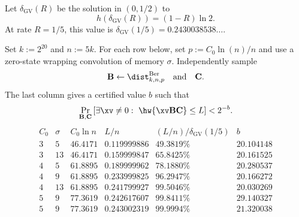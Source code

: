 Let $\delta_{\mathrm{GV}}(R)$ be the solution in $(0,1/2)$ to
\begin{equation}
 h(\delta_{\mathrm{GV}}(R))=(1-R)\ln2.
 \label{eq:binary-gv-distance}
\end{equation}
At rate $R=1/5$, this value is
$\delta_{\mathrm{GV}}(1/5)=0.2430038538\ldots$.

\begin{theorem}
\label{thm:wrapped-ec-certified-finite-gv}
Set $k:=2^{20}$ and $n:=5k$.  For each row below, set
$p:=C_0\ln(n)/n$ and use a zero-state wrapping convolution of memory
$\sigma$.  Independently sample
\[
 \B\gets\dist^{\mathrm{Ber}}_{k,n,p}
 \quad\text{and}\quad \C.
\]
The last column gives a certified value $b$ such that
\begin{equation}
 \Pr_{\B,\C}\left[
  \exists\xv\neq0:\ \hw{\xv\B\C}\leq L
 \right]<2^{-b}.
 \label{eq:wrapped-ec-finite-gv-result}
\end{equation}
\[
\begin{array}{c|c|c|c|c|c}
C_0&\sigma&C_0\ln n&L/n
 &(L/n)/\delta_{\mathrm{GV}}(1/5)&b\\ \hline
3&5 &46.4171&0.119999886&49.3819\%&20.104148\\
3&13&46.4171&0.159999847&65.8425\%&20.161525\\
4&5 &61.8895&0.189999962&78.1880\%&20.280537\\
4&9 &61.8895&0.233999825&96.2947\%&20.166272\\
4&13&61.8895&0.241799927&99.5046\%&20.030269\\
5&9 &77.3619&0.242617607&99.8411\%&29.140327\\
5&9 &77.3619&0.243002319&99.9994\%&21.320038
\end{array}
\]
\end{theorem}

